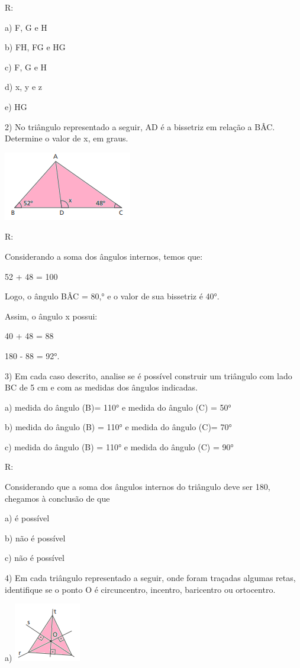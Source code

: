 R:

a) F, G e H

b) FH, FG e HG

c) F, G e H

d) x, y e z

e) HG

2) No triângulo representado a seguir, AD é a bissetriz em relação a
BÂC. Determine o valor de x, em graus.

\includegraphics[width=2.20833in,height=1.1875in]{./imgSAEB_8_MAT/media/image14.png}

R:

Considerando a soma dos ângulos internos, temos que:

52 + 48 = 100

Logo, o ângulo BÂC = 80,° e o valor de sua bissetriz é 40°.

Assim, o ângulo x possui:

40 + 48 = 88

180 - 88 = 92°.

3) Em cada caso descrito, analise se é possível construir um triângulo
com lado BC de 5 cm e com as medidas dos ângulos indicadas.

a) medida do ângulo (B)= 110° e medida do ângulo (C) = 50°

b) medida do ângulo (B) = 110° e medida do ângulo (C)= 70°

c) medida do ângulo (B) = 110° e medida do ângulo (C) = 90°

R:

Considerando que a soma dos ângulos internos do triângulo deve ser 180,
chegamos à conclusão de que

a) é possível

b) não é possível

c) não é possível

4) Em cada triângulo representado a seguir, onde foram traçadas algumas
retas, identifique se o ponto O é circuncentro, incentro, baricentro ou
ortocentro.

a)
\includegraphics[width=1.14583in,height=1.01042in]{./imgSAEB_8_MAT/media/image15.png}

